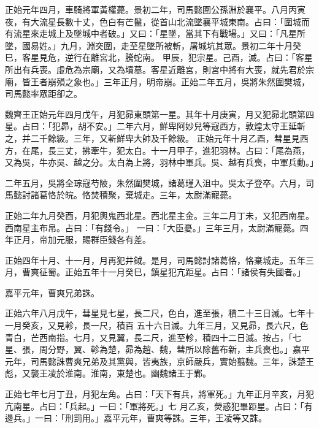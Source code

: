 \begin{pinyinscope}
 正始元年四月，車騎將軍黃權薨。景初二年，司馬懿圍公孫淵於襄平。八月丙寅夜，有大流星長數十丈，色白有芒鬣，從首山北流墜襄平城東南。占曰：「圍城而有流星來走城上及墜城中者破。」又曰：「星墜，當其下有戰場。」又曰：「凡星所墜，國易姓。」九月，淵突圍，走至星墜所被斬，屠城坑其眾。景初二年十月癸巳，客星見危，逆行在離宮北，騰蛇南。
 甲辰，犯宗星。己酉，滅。占曰：「客星所出有兵喪。虛危為宗廟，又為墳墓。客星近離宮，則宮中將有大喪，就先君於宗廟，皆王者崩殞之象也。」三年正月，明帝崩。正始二年五月，吳將朱然圍樊城，司馬懿率眾距卻之。



 魏齊王正始元年四月戊午，月犯昴東頭第一星。其年十月庚寅，月又犯昴北頭第四星。占曰：「犯昴，胡不安。」二年六月，鮮卑阿妙兒等寇西方，敦煌太守王延斬之，并二千餘級。三年，又斬鮮卑大帥及千餘級。
 正始元年十月乙酉，彗星見西方，在尾，長三丈，拂牽牛，犯太白。十一月甲子，進犯羽林。占曰：「尾為燕，又為吳，牛亦吳、越之分。太白為上將，羽林中軍兵。吳、越有兵喪，中軍兵動。」



 二年五月，吳將全琮寇芍陂，朱然圍樊城，諸葛瑾入沮中。吳太子登卒。六月，司馬懿討諸葛恪於皖。恪焚積聚，棄城走。三年，太尉滿寵薨。



 正始二年九月癸酉，月犯輿鬼西北星。西北星主金。三年二月丁未，又犯西南星。西南星主布帛。占曰：「有錢令。」
 一曰：「大臣憂。」三年三月，太尉滿寵薨。四年正月，帝加元服，賜群臣錢各有差。



 正始四年十月、十一月，月再犯井鉞。是月，司馬懿討諸葛恪，恪棄城走。五年三月，曹爽征蜀。正始五年十一月癸巳，鎮星犯亢距星。占曰：「諸侯有失國者。」



 嘉平元年，曹爽兄弟誅。



 正始六年八月戊午，彗星見七星，長二尺，色白，進至張，積二十三日滅。七年十一月癸亥，又見軫，長一尺，積百
 五十六日滅。九年三月，又見昴，長六尺，色青白，芒西南指。七月，又見翼，長二尺，進至軫，積四十二日滅。按占，「七星、張，周分野，翼、軫為楚，昴為趙、魏，彗所以除舊布新，主兵喪也。」嘉平元年，司馬懿誅曹爽兄弟及其黨與，皆夷族，京師嚴兵，實始翦魏。三年，誅楚王彪，又襲王凌於淮南。淮南，東楚也。幽魏諸王于鄴。



 正始七年七月丁丑，月犯左角。占曰：「天下有兵，將軍死。」九年正月辛亥，月犯亢南星。占曰：「兵起。」一曰：「軍將死。」七
 月乙亥，熒惑犯畢距星。占曰：「有邊兵。」一曰：「刑罰用。」嘉平元年，曹爽等誅。三年，王凌等又誅。




\end{pinyinscope}
